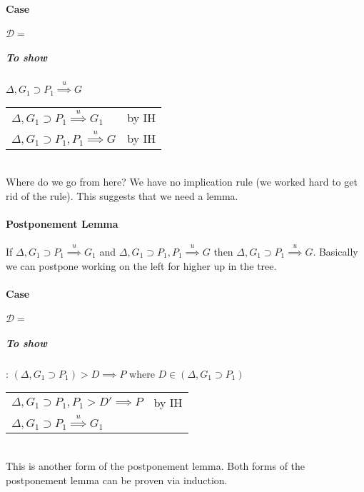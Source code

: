 \documentclass[12 pt]{article}
\begin{document}
       \paragraph{Case} $\mathcal{D} = $
       \DP
       \subparagraph{To show} $\Delta, G_1 \supset P_1
       \stackrel{u}{\implies} G$
       \\ \begin{tabular}{l l}
            $\Delta, G_1 \supset P_1 \stackrel{u}{\implies} G_1$ & by IH
            \\ $\Delta, G_1 \supset P_1, P_1 \stackrel{u}{\implies} G$ & by IH
       \end{tabular}
       \\ Where do we go from here? We have no implication rule (we
       worked hard to get rid of the rule). This suggests that we need
       a lemma.
       \paragraph{Postponement Lemma}
       If $\Delta, G_1 \supset P_1 \stackrel{u}{\implies}G_1$ and
       $\Delta, G_1 \supset P_1, P_1 \stackrel{u}{\implies} G$ then
       $\Delta, G_1 \supset P_1 \stackrel{u}{\implies} G$. Basically
       we can postpone working on the left for higher up in the tree.
       \paragraph{Case} $\mathcal{D} = $
       \DP
       \subparagraph{To show}: $(\Delta, G_1 \supset P_1) > D \implies
       P$ where $D \in (\Delta, G_1 \supset P_1)$
       \\
       \begin{tabular}{l l}
         $\Delta, G_1 \supset P_1, P_1 > D' \implies P$& by IH
         \\ $\Delta, G_1 \supset P_1 \stackrel{u}{\implies} G_1$
       \end{tabular}
       \\ This is another form of the postponement lemma. Both forms
       of the postponement lemma can be proven via induction.
\end{document}
